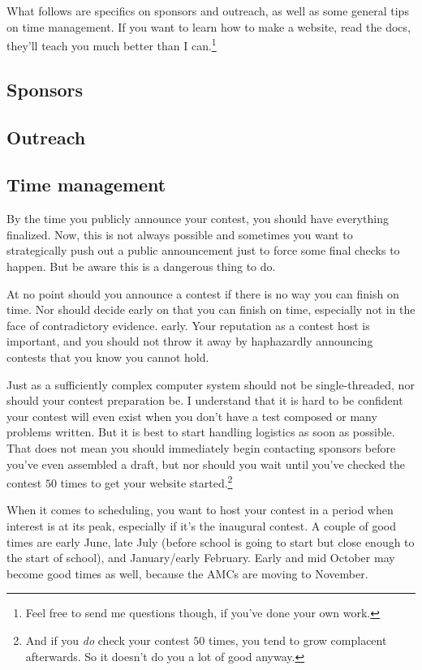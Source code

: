 \documentclass[points=false]{bounce}
\begin{document}
What follows are specifics on sponsors and outreach, as well as some general tips on time management. If you want to learn how to make a website, read the docs, they'll teach you much better than I can.\footnote{Feel free to send me questions though, if you've done your own work.}

\subsection{Sponsors}

\subsection{Outreach}



\subsection{Time management}

By the time you publicly announce your contest, you should have everything finalized. Now, this is not always possible and sometimes you want to strategically push out a public announcement just to force some final checks to happen. But be aware this is a dangerous thing to do.

At no point should you announce a contest if there is no way you can finish on time.
Nor should decide early on that you can finish on time, especially not in the face of contradictory evidence. early.
Your reputation as a contest host is important,
and you should not throw it away by haphazardly announcing contests that you know you cannot hold.

Just as a sufficiently complex computer system should not be single-threaded, nor should your contest preparation be. I understand that it is hard to be confident your contest will even exist when you don't have a test composed or many problems written. But it is best to start handling logistics as soon as possible. That does not mean you should immediately begin contacting sponsors before you've even assembled a draft, but nor should you wait until you've checked the contest $50$ times to get your website started.\footnote{And if you \emph{do} check your contest $50$ times, you tend to grow complacent afterwards. So it doesn't do you a lot of good anyway.}

When it comes to scheduling, you want to host your contest in a period when interest is at its peak, especially if it's the inaugural contest. A couple of good times are early June, late July (before school is going to start but close enough to the start of school), and January/early February. Early and mid October may become good times as well, because the AMCs are moving to November. 
\end{document}
